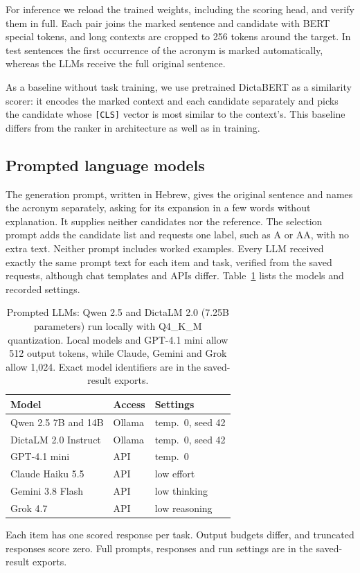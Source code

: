 For inference we reload the trained weights, including the scoring head, and verify them in full. Each pair joins the marked sentence and candidate with BERT special tokens, and long contexts are cropped to 256 tokens around the target. In test sentences the first occurrence of the acronym is marked automatically, whereas the LLMs receive the full original sentence.

As a baseline without task training, we use pretrained DictaBERT as a similarity scorer: it encodes the marked context and each candidate separately and picks the candidate whose \texttt{[CLS]} vector is most similar to the context's. This baseline differs from the ranker in architecture as well as in training.

\subsection{Prompted language models}
The generation prompt, written in Hebrew, gives the original sentence and names the acronym separately, asking for its expansion in a few words without explanation. It supplies neither candidates nor the reference. The selection prompt adds the candidate list and requests one label, such as A or AA, with no extra text. Neither prompt includes worked examples. Every LLM received exactly the same prompt text for each item and task, verified from the saved requests, although chat templates and APIs differ. Table~\ref{tab:llms} lists the models and recorded settings.

\begin{table}[t]
\centering\small
\setlength{\tabcolsep}{3pt}
\begin{tabular}{@{}lll@{}}
\toprule
Model & Access & Settings \\
\midrule
Qwen 2.5 7B and 14B & Ollama & temp.\ 0, seed 42 \\
DictaLM 2.0 Instruct & Ollama & temp.\ 0, seed 42 \\
GPT-4.1 mini & API & temp.\ 0 \\
Claude Haiku 5.5 & API & low effort \\
Gemini 3.8 Flash & API & low thinking \\
Grok 4.7 & API & low reasoning \\
\bottomrule
\end{tabular}
\caption{Prompted LLMs: Qwen 2.5 \citep{qwen2025technical} and DictaLM 2.0 (7.25B parameters) \citep{shmidman2024dictalm} run locally with Q4\_K\_M quantization. Local models and GPT-4.1 mini allow 512 output tokens, while Claude, Gemini and Grok allow 1,024. Exact model identifiers are in the saved-result exports.}
\label{tab:llms}
\end{table}

Each item has one scored response per task. Output budgets differ, and truncated responses score zero. Full prompts, responses and run settings are in the saved-result exports.
